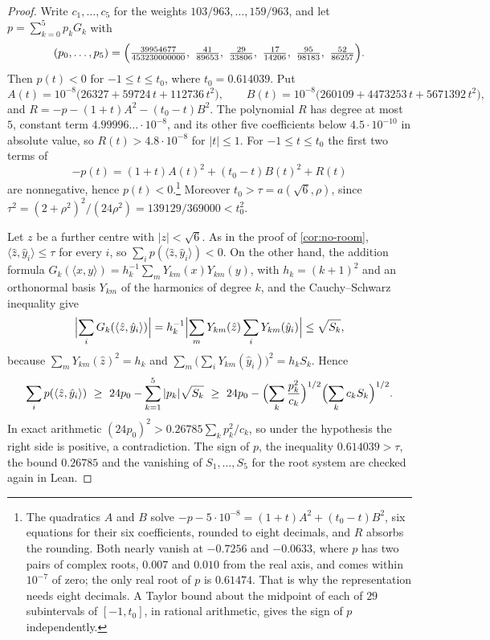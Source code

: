 \documentclass[11pt,reqno]{amsart}
\renewcommand{\_}{\origunderscore\allowbreak}
\numberwithin{equation}{section}
\theoremstyle{plain}
\theoremstyle{definition}
\theoremstyle{remark}
\begin{document}
\begin{proof}
Write $c_1,\dots,c_5$ for the weights $103/963,\dots,159/963$, and let
$p=\sum_{k=0}^5p_kG_k$ with
\[
  (p_0,\dots,p_5)=\Bigl(\tfrac{39954677}{453230000000},\ \tfrac{41}{89653},\
  \tfrac{29}{33806},\ \tfrac{17}{14206},\ \tfrac{95}{98183},\
  \tfrac{52}{86257}\Bigr).
\]
Then $p(t)<0$ for $-1\le t\le t_0$, where $t_0=0.614039$. Put
\[
  A(t)=10^{-8}\bigl(26327+59724\,t+112736\,t^2\bigr),\qquad
  B(t)=10^{-8}\bigl(260109+4473253\,t+5671392\,t^2\bigr),
\]
and $R=-p-(1+t)A^2-(t_0-t)B^2$. The polynomial $R$ has degree at most $5$,
constant term $4.99996\ldots\cdot10^{-8}$, and its other five coefficients
below $4.5\cdot10^{-10}$ in absolute value, so $R(t)>4.8\cdot10^{-8}$ for
$|t|\le1$. For $-1\le t\le t_0$ the first two terms of
\[
  -p(t)=(1+t)A(t)^2+(t_0-t)B(t)^2+R(t)
\]
are nonnegative, hence $p(t)<0$.\footnote{The quadratics $A$ and $B$ solve
  $-p-5\cdot10^{-8}=(1+t)A^2+(t_0-t)B^2$, six equations for their six
  coefficients, rounded to eight decimals, and $R$ absorbs the rounding. Both nearly vanish at $-0.7256$ and $-0.0633$, where $p$ has two
  pairs of complex roots, $0.007$ and $0.010$ from the real axis, and comes
  within $10^{-7}$ of zero; the only real root of $p$ is $0.61474$. That is
  why the representation needs eight decimals. A Taylor bound about the
  midpoint of each of $29$ subintervals of $[-1,t_0]$, in rational arithmetic,
  gives the sign of $p$ independently.} Moreover $t_0>\tau=a(\sqrt6,\rho)$,
since $\tau^2=(2+\rho^2)^2/(24\rho^2)=139129/369000<t_0^2$.

Let $z$ be a further centre with $|z|<\sqrt6$. As in the proof of
\cref{cor:no-room}, $\langle\hat z,\hat y_i\rangle\le\tau$ for every $i$,
so $\sum_ip(\langle\hat z,\hat y_i\rangle)<0$. On the other hand, the
addition formula $G_k(\langle x,y\rangle)=h_k^{-1}\sum_mY_{km}(x)Y_{km}(y)$,
with $h_k=(k+1)^2$ and an orthonormal basis $Y_{km}$ of the harmonics of
degree $k$, and the Cauchy--Schwarz inequality give
\[
  \Bigl|\sum_iG_k(\langle\hat z,\hat y_i\rangle)\Bigr|
  =h_k^{-1}\Bigl|\sum_mY_{km}(\hat z)\sum_iY_{km}(\hat y_i)\Bigr|
  \le\sqrt{S_k},
\]
because $\sum_mY_{km}(\hat z)^2=h_k$ and
$\sum_m\bigl(\sum_iY_{km}(\hat y_i)\bigr)^2=h_kS_k$. Hence
\[
  \sum_ip(\langle\hat z,\hat y_i\rangle)
  \ \ge\ 24p_0-\sum_{k=1}^5|p_k|\sqrt{S_k}
  \ \ge\ 24p_0-\Bigl(\sum_k\frac{p_k^2}{c_k}\Bigr)^{1/2}
          \Bigl(\sum_kc_kS_k\Bigr)^{1/2}.
\]
In exact arithmetic $(24p_0)^2>0.26785\sum_kp_k^2/c_k$, so under the
hypothesis the right side is positive, a contradiction. The sign of $p$, the
inequality $0.614039>\tau$, the bound $0.26785$ and the vanishing of
$S_1,\dots,S_5$ for the root system are checked again in Lean.
\end{proof}
\end{document}
